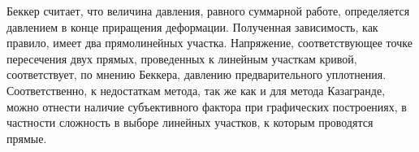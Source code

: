 Беккер считает, что величина давления, равного суммарной работе, определяется давлением в конце приращения деформации. Полученная зависимость, как правило, имеет два прямолинейных участка. Напряжение, соответствующее точке пересечения двух прямых, проведенных к линейным участкам кривой, соответствует, по мнению Беккера, давлению предварительного уплотнения.
Соответственно, к недостаткам метода, так же как и для метода Казагранде, можно отнести наличие субъективного фактора при графических построениях, в частности сложность в выборе линейных участков, к которым проводятся прямые. 
